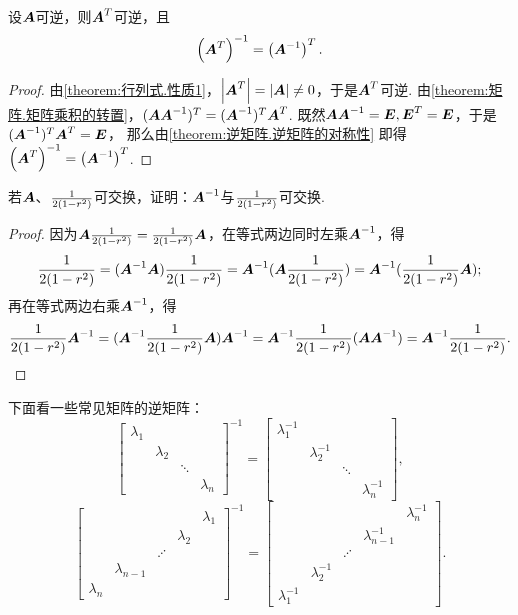 \begin{property}\label{theorem:逆矩阵.转置矩阵的逆与逆矩阵的转置}
设\(\A\)可逆，则\(\A^T\)可逆，且\begin{equation}
	\left(\A^T\right)^{-1}=\left(\A^{-1}\right)^T.
\end{equation}
\begin{proof}
由\cref{theorem:行列式.性质1}，\(\abs{\A^T}=\abs{\A}\neq0\)，于是\(\A^T\)可逆.
由\cref{theorem:矩阵.矩阵乘积的转置}，\((\A \A^{-1})^T = (\A^{-1})^T \A^T\).
既然\(\A \A^{-1} = \E, \E^T = \E\)，于是\((\A^{-1})^T \A^T = \E\)，
那么由\cref{theorem:逆矩阵.逆矩阵的对称性} 即得
\(\left(\A^T\right)^{-1}=\left(\A^{-1}\right)^T\).
\end{proof}
\end{property}

\begin{example}
若\(\A\)、\(\B\)可交换，证明：\(\A^{-1}\)与\(\B\)可交换.
\begin{proof}
因为\(\A\B = \B\A\)，在等式两边同时左乘\(\A^{-1}\)，得\[
\B = (\A^{-1}\A)\B = \A^{-1}(\A\B) = \A^{-1}(\B\A);
\]再在等式两边右乘\(\A^{-1}\)，得\[
\B\A^{-1} = (\A^{-1}\B\A)\A^{-1} = \A^{-1}\B(\A\A^{-1}) = \A^{-1}\B.
\qedhere
\]
\end{proof}
\end{example}

\begin{example}
下面看一些常见矩阵的逆矩阵：
\[
\begin{bmatrix}
\lambda_1 \\
& \lambda_2 \\
&& \ddots \\
&&& \lambda_n
\end{bmatrix}^{-1}
= \begin{bmatrix}
\lambda_1^{-1} \\
& \lambda_2^{-1} \\
&& \ddots \\
&&& \lambda_n^{-1}
\end{bmatrix},
\]\[
\begin{bmatrix}
& & & & \lambda_1 \\
& & & \lambda_2 \\
& & \iddots \\
& \lambda_{n-1} \\
\lambda_n
\end{bmatrix}^{-1}
= \begin{bmatrix}
& & & & \lambda_n^{-1} \\
& & & \lambda_{n-1}^{-1} \\
& & \iddots \\
& \lambda_2^{-1} \\
\lambda_1^{-1}
\end{bmatrix}.
\]
\end{example}

